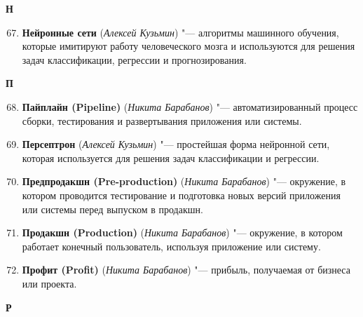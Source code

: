 \begin{flushleft} \large\textbf{Н} \end{flushleft}

\begin{enumerate}
    \setcounter{enumi}{66}

    \item \textbf{Нейронные сети} (\textit{Алексей Кузьмин}) "--- 
    алгоритмы машинного обучения, которые имитируют работу человеческого мозга и используются для решения задач классификации, регрессии и прогнозирования.
\end{enumerate}

\begin{flushleft} \large\textbf{П} \end{flushleft}

\begin{enumerate}
    \setcounter{enumi}{67}

    \item \textbf{Пайплайн (Pipeline)} (\textit{Никита Барабанов}) "--- 
    автоматизированный процесс сборки, тестирования и развертывания приложения или системы.

    \item \textbf{Персептрон} (\textit{Алексей Кузьмин}) "--- 
    простейшая форма нейронной сети, которая используется для решения задач классификации и регрессии.

    \item \textbf{Предпродакшн (Pre-production)} (\textit{Никита Барабанов}) "--- 
    окружение, в котором проводится тестирование и подготовка новых версий приложения или системы перед выпуском в продакшн. 

    \item \textbf{Продакшн (Production)} (\textit{Никита Барабанов}) "--- 
    окружение, в котором работает конечный пользователь, используя приложение или систему.

    \item \textbf{Профит (Profit)} (\textit{Никита Барабанов}) "--- 
    прибыль, получаемая от бизнеса или проекта. 
\end{enumerate}

\begin{flushleft} \large\textbf{Р} \end{flushleft}

